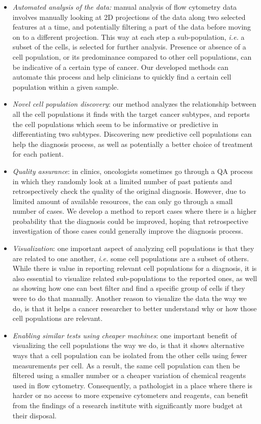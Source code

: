 \begin{itemize}
  \item \emph{Automated analysis of the data:} manual analysis of flow
    cytometry data involves manually looking at 2D projections of the data
    along two selected features at a time, and potentially filtering a part of
    the data before moving on to a different projection. This way at each step
    a sub-population, \emph{i.e.} a subset of the cells, is selected for
    further analysis. Presence or absence of a cell population, or its
    predominance compared to other cell populations, can be indicative of a
    certain type of cancer. Our developed methods can automate this process and
    help clinicians to quickly find a certain cell population within a given
    sample.
  \item \emph{Novel cell population discovery}: our method analyzes the
    relationship between all the cell populations it finds with the target
    cancer subtypes, and reports the cell populations which seem to be
    informative or predictive in differentiating two subtypes. Discovering new
    predictive cell populations can help the diagnosis process, as well as
    potentially a better choice of treatment for each patient.
  \item \emph{Quality assurance}: in clinics, oncologists sometimes go through
    a QA process in which they randomly look at a limited number of past
    patients and retrospectively check the quality of the original diagnosis.
    However, due to limited amount of available resources, the can only go
    through a small number of cases. We develop a method to report cases where
    there is a higher probability that the diagnosis could be improved, hoping
    that retrospective investigation of those cases could generally improve the
    diagnosis process.
  \item \emph{Visualization}: one important aspect of analyzing cell populations is
    that they are related to one another, \emph{i.e.} some cell populations are
    a subset of others. While there is value in reporting relevant cell
    populations for a diagnosis, it is also essential to visualize related
    sub-populations to the reported ones, as well as showing how one can best
    filter and find a specific group of cells if they were to do that manually.
    Another reason to visualize the data the way we do, is that it helps a
    cancer researcher to better understand why or how those cell populations
    are relevant.
  \item \emph{Enabling similar tests using cheaper machines}: one important
    benefit of visualizing the cell populations the way we do, is that it shows
    alternative ways that a cell population can be isolated from the other
    cells using fewer measurements per cell. As a result, the same cell
    population can then be filtered using a smaller number or a cheaper
    variation of chemical reagents used in flow cytometry. Consequently, a
    pathologist in a place where there is harder or no access to more expensive
    cytometers and reagents, can benefit from the findings of a research
    institute with significantly more budget at their disposal.
\end{itemize}

